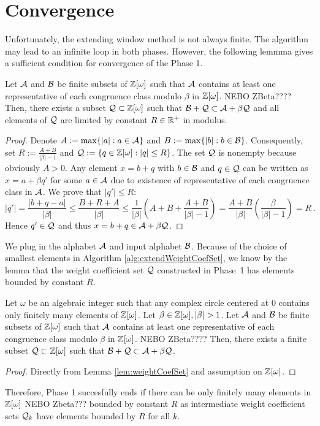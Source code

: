 \section{Convergence}
Unfortunately, the extending window method is not always finite. The algorithm may lead to an infinite loop in both phases. 
However, the following lemmma gives a sufficient condition for convergence of the Phase 1. 
\begin{lem}
\label{lem:weightCoefSet}
    Let $\mathcal{A}$ and $\mathcal{B}$ be finite subsets of $\mathbb{Z}[\omega]$ such that $\mathcal{A}$ contains at least one representative of each congruence class modulo $\beta$ in $\mathbb{Z}[\omega]$. NEBO ZBeta???? Then, there exists a subset $\mathcal{Q}\subset\mathbb{Z}[\omega]$ such that $ \mathcal{B} + \mathcal{Q} \subset \mathcal{A} + \beta \mathcal{Q}$ and all elements of $\mathcal{Q}$ are limited by constant $R\in \mathbb{R}^+$ in modulus.
\end{lem}
\begin{proof}
 Denote $A:=\max\{|a|:a \in \mathcal{A}\}$ and $B:=\max\{|b|:b\in\mathcal{B}\}$. Consequently, set $R:=\frac{A+B}{|\beta|-1}$ and $\mathcal{Q}:=\{q\in\mathbb{Z}[\omega]:|q|\leq R\}$. The set $\mathcal{Q}$ is nonempty because obviously $A>0$. Any element $x=b+q$ with $b\in\mathcal{B}$ and $q\in\mathcal{Q}$ can be written as $x=a+\beta q'$ for some $a\in\mathcal{A}$ due to existence of representative of each congruence class in $\mathcal{A}$. We prove that $|q'|\leq R$:
 $$
    |q'|=\frac{|b+q-a|}{|\beta|}\leq \frac{B+R+A}{|\beta|} \leq \frac{1}{|\beta|}\left(A+B+\frac{A+B}{|\beta|-1}\right)  =\frac{A+B}{|\beta|}\left(\frac{\beta}{|\beta|-1}\right)=R\,.
 $$ 
 Hence $q'\in\mathcal{Q}$ and thus  $x=b+q \in \mathcal{A} + \beta \mathcal{Q}$.
\end{proof}
We plug in the alphabet $\mathcal{A}$ and input alphabet $\mathcal{B}$. Because of the choice of smallest elements in Algorithm \ref{alg:extendWeightCoefSet}, we know by the lemma that the weight coefficient set $\mathcal{Q}$ constructed in Phase~1 has elements bounded by constant $R$. 
\begin{theo}
    Let $\omega$ be an algebraic integer such that any complex circle centered at 0 contains only finitely  many elements of $\mathbb{Z}[\omega]$. Let $\beta \in \Zomega, |\beta|>1$. Let $\mathcal{A}$ and $\mathcal{B}$ be finite subsets of $\mathbb{Z}[\omega]$ such that $\mathcal{A}$ contains at least one representative of each congruence class modulo $\beta$ in $\mathbb{Z}[\omega]$. NEBO ZBeta???? Then, there exists a finite subset $\mathcal{Q}\subset\mathbb{Z}[\omega]$ such that $ \mathcal{B} + \mathcal{Q} \subset \mathcal{A} + \beta \mathcal{Q}$.
\end{theo} 
\begin{proof}
    Directly from Lemma \ref{lem:weightCoefSet} and assumption on $\mathbb{Z}[\omega]$.
\end{proof}
Therefore, Phase 1 succesfully ends if there can be only finitely many elements in $\mathbb{Z}[\omega]$ NEBO Zbeta??? bounded by constant $R$ as intermediate weight coefficient sets $\mathcal{Q}_k$ have elements bounded by $R$ for all $k$. 
